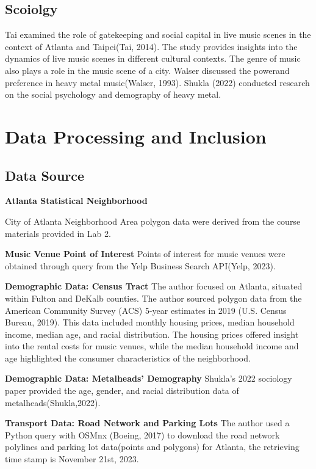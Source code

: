 \documentclass[11pt]{article}
\begin{document}
\subsection{Scoiolgy}
Tai examined the role of gatekeeping and social capital in live music scenes in the context of Atlanta and Taipei(Tai, 2014). The study provides insights into the dynamics of live music scenes in different cultural contexts. The genre of music also plays a role in the music scene of a city. Walser discussed the powerand preference in heavy metal music(Walser, 1993). Shukla (2022) conducted research on the social psychology and demography of heavy metal.

\section{Data Processing and Inclusion}

\subsection{Data Source}

\textbf{Atlanta Statistical Neighborhood}

City of Atlanta Neighborhood Area polygon data were derived from the course materials provided in Lab 2.

\textbf{Music Venue Point of Interest}
Points of interest for music venues were obtained through query from the Yelp Business Search API(Yelp, 2023). 

\textbf{Demographic Data: Census Tract} The author focused on Atlanta, situated within Fulton and DeKalb counties. The author sourced polygon data from the American Community Survey (ACS) 5-year estimates in 2019 (U.S. Census Bureau, 2019). This data included monthly housing prices, median household income, median age, and racial distribution. The housing prices offered insight into the rental costs for music venues, while the median household income and age highlighted the consumer characteristics of the neighborhood.

\textbf{Demographic Data: Metalheads’ Demography} 
Shukla’s 2022 sociology paper provided the age, gender, and racial distribution data of metalheads(Shukla,2022).

\textbf{Transport Data: Road Network and Parking Lots} 
The author used a Python query with OSMnx (Boeing, 2017) to download the road network polylines and parking lot data(points and polygons) for Atlanta, the retrieving time stamp is November 21st, 2023.
\end{document}

